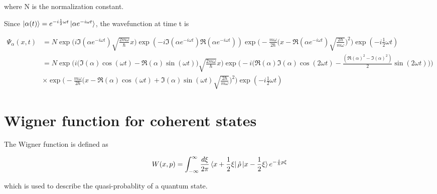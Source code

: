 \documentclass{article}
\begin{document}
        where N is the normalization constant.

        Since $\ket{\alpha(t)}=e^{-i\frac{1}{2}\omega t}\ket{\alpha e^{-i\omega t}}$, the wavefunction at time t is 

        \begin{equation}
            \begin{split}
                \Psi_\alpha(x,t) &= N \exp\biggl(i\Im(\alpha e^{-i\omega t})\sqrt{\frac{2m\omega}{\hbar}}x\biggr) \exp(-i\Im(\alpha e^{-i\omega t})\Re(\alpha e^{-i\omega t})) \exp\biggl(-\frac{m\omega}{2\hbar} \bigl(x-\Re(\alpha e^{-i\omega t})\sqrt{\frac{2\hbar}{m\omega}}\bigr)^2 \biggr) \exp(-i\frac{1}{2}\omega t) \\
                    &= N \exp\biggl(i\bigl(\Im(\alpha)\cos(\omega t)-\Re(\alpha)\sin(\omega t)\bigr) \sqrt{\frac{2m\omega}{\hbar}}x\biggr) \exp\biggl(-i\bigl(\Re(\alpha)\Im(\alpha)\cos(2\omega t)-\frac{(\Re(\alpha)^2-\Im(\alpha)^2)}{2}\sin(2\omega t)\bigr)\biggr) \\
                    &\times \exp\biggl(-\frac{m\omega}{2\hbar} \bigl(x-\Re(\alpha)\cos(\omega t)+\Im(\alpha)\sin(\omega t)\sqrt{\frac{2\hbar}{m\omega}}\bigr)^2 \biggr) \exp(-i\frac{1}{2}\omega t)
            \end{split}
        \end{equation}
        

    \section{Wigner function for coherent states}

        The Wigner function is defined as 

        \begin{equation}
            W(x, p) = \int_{-\infty}^\infty \frac{d\xi}{2\pi}\bra{x+\frac{1}{2}\xi}\hat{\rho}\ket{x-\frac{1}{2}\xi} e^{-\frac{i}{\hbar}p\xi}
        \end{equation}
        
        which is used to describe the quasi-probablity of a quantum state.
\end{document}
